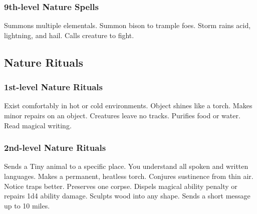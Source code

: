 \subsubsection{9th-level Nature Spells}
\begin{spelllist}
   Summons multiple elementals.
   Summon bison to trample foes.
   Storm rains acid, lightning, and hail.
   Calls creature to fight.
\end{spelllist}

\subsection{Nature Rituals}\label{Nature Rituals}

\subsubsection{1st-level Nature Rituals}
\begin{rituallist}
     Exist comfortably in hot or cold environments.
     Object shines like a torch.
     Makes minor repairs on an object.
     Creatures leave no tracks.
     Purifies food or water.
     Read magical writing.
\end{rituallist}

\subsubsection{2nd-level Nature Rituals}
\begin{rituallist}
     Sends a Tiny animal to a specific place.
     You understand all spoken and written languages.
     Makes a permanent, heatless torch.
     Conjures sustinence from thin air.
     Notice traps better.
     Preserves one corpse.
     Dispels magical ability penalty or repairs 1d4 ability damage.
     Sculpts wood into any shape.
     Sends a short message up to 10 miles.
\end{rituallist}

